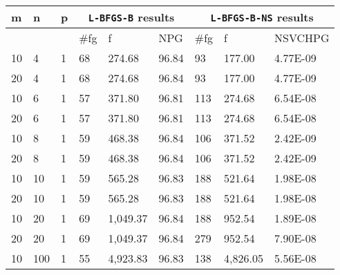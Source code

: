 \begin{table}
  \begin{center}
    \begin{tabular}{|l|l|l|l|l|l|l|l|l|}
      \hline
      m  &  n  &  p  & \multicolumn{3}{|c|}{\texttt{L-BFGS-B} results} & \multicolumn{3}{|c|}{\texttt{L-BFGS-B-NS} results} \\ \hline
      &&  & \#fg & f & NPG & \#fg & f & NSVCHPG \\ \hline
      10 & 4 & 1 & 68 & 274.68 & 96.84 & 93 & 177.00 & 4.77E-09 \\
      20 & 4 & 1 & 68 & 274.68 & 96.84 & 93 & 177.00 & 4.77E-09 \\
      10 & 6 & 1 & 57 & 371.80 & 96.81 & 113 & 274.68 & 6.54E-08 \\
      20 & 6 & 1 & 57 & 371.80 & 96.81 & 113 & 274.68 & 6.54E-08 \\
      10 & 8 & 1 & 59 & 468.38 & 96.84 & 106 & 371.52 & 2.42E-09 \\
      20 & 8 & 1 & 59 & 468.38 & 96.84 & 106 & 371.52 & 2.42E-09 \\
      10 & 10 & 1 & 59 & 565.28 & 96.83 & 188 & 521.64 & 1.98E-08 \\
      20 & 10 & 1 & 59 & 565.28 & 96.83 & 188 & 521.64 & 1.98E-08 \\
      10 & 20 & 1 & 69 & 1,049.37 & 96.84 & 188 & 952.54 & 1.89E-08 \\
      20 & 20 & 1 & 69 & 1,049.37 & 96.84 & 279 & 952.54 & 7.90E-08 \\
      10 & 100 & 1 & 55 & 4,923.83 & 96.83 & 138 & 4,826.05 & 5.56E-08 \\

\end{tabular}
\end{center}
\end{table}
